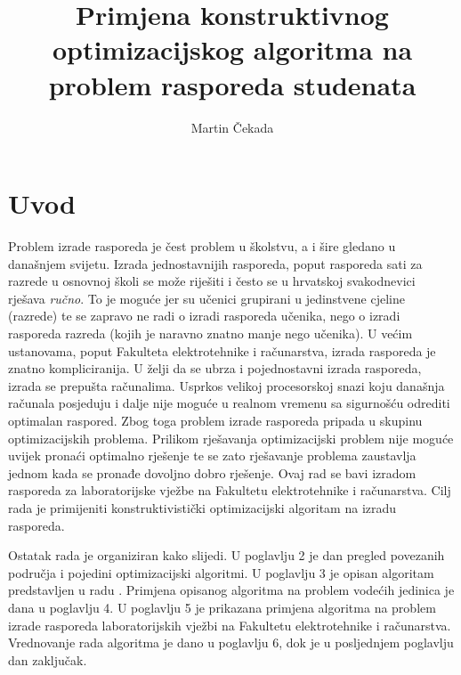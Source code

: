 \documentclass[times, utf8, zavrsni]{fer}
\begin{document}

\title{Primjena konstruktivnog optimizacijskog algoritma na problem
rasporeda studenata}

\author{Martin Čekada}

\maketitle

\izvornik


\tableofcontents

\chapter{Uvod}
Problem izrade rasporeda je čest problem u školstvu, a i šire gledano u današnjem svijetu. Izrada jednostavnijih rasporeda, poput
rasporeda sati za razrede u osnovnoj školi se može riješiti i često se u hrvatskoj svakodnevici rješava \textit{ručno}. To je moguće jer su učenici
grupirani u jedinstvene cjeline (razrede) te se zapravo ne radi o izradi rasporeda učenika, nego o izradi rasporeda razreda (kojih je naravno znatno manje nego učenika).
U većim ustanovama, poput Fakulteta elektrotehnike i računarstva, izrada rasporeda je znatno kompliciranija. U želji da se ubrza i pojednostavni izrada rasporeda,
izrada se prepušta računalima. Usprkos velikoj procesorskoj snazi koju današnja računala posjeduju i dalje nije moguće u realnom vremenu sa sigurnošću odrediti
optimalan raspored. Zbog toga problem izrade rasporeda pripada u skupinu optimizacijskih problema. Prilikom rješavanja optimizacijski problem nije moguće uvijek pronaći
optimalno rješenje te se zato rješavanje problema zaustavlja jednom kada se pronađe dovoljno dobro rješenje.
Ovaj rad se bavi izradom rasporeda za laboratorijske vježbe na Fakultetu elektrotehnike i računarstva. Cilj rada je
primijeniti konstruktivistički optimizacijski algoritam na izradu rasporeda.

Ostatak rada je organiziran kako slijedi. U poglavlju 2 je dan pregled povezanih područja i pojedini optimizacijski algoritmi. U poglavlju 3 je opisan algoritam
predstavljen u radu \cite{DBLP:journals/tec/WuK14}. Primjena opisanog algoritma na problem vodećih jedinica je dana u poglavlju 4. U poglavlju 5 je prikazana primjena
algoritma na problem izrade rasporeda laboratorijskih vježbi na Fakultetu elektrotehnike i računarstva. Vrednovanje rada algoritma je dano u poglavlju 6, dok je
u posljednjem poglavlju dan zaključak.
\end{document}
